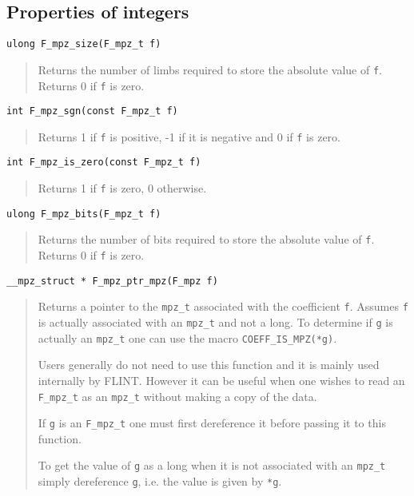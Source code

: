 \documentclass[a4paper,10pt]{article}
\newcommand{\code}{\lstinline}
\begin{document}
\subsection{Properties of integers}

\begin{lstlisting}
ulong F_mpz_size(F_mpz_t f)
\end{lstlisting}
\begin{quote}
Returns the number of limbs required to store the absolute value of \code{f}. Returns 0 if \code{f} is zero.
\end{quote}

\begin{lstlisting}
int F_mpz_sgn(const F_mpz_t f)
\end{lstlisting}
\begin{quote}
Returns 1 if \code{f} is positive, -1 if it is negative and 0 if \code{f} is zero.
\end{quote}

\begin{lstlisting}
int F_mpz_is_zero(const F_mpz_t f)
\end{lstlisting}
\begin{quote}
Returns 1 if \code{f} is zero, 0 otherwise.
\end{quote}

\begin{lstlisting}
ulong F_mpz_bits(F_mpz_t f)
\end{lstlisting}
\begin{quote}
Returns the number of bits required to store the absolute value of \code{f}. Returns 0 if \code{f} is zero.
\end{quote}

\begin{lstlisting}
__mpz_struct * F_mpz_ptr_mpz(F_mpz f)
\end{lstlisting}
\begin{quote}
Returns a pointer to the \code{mpz_t} associated with the coefficient \code{f}. Assumes \code{f} is actually associated with an \code{mpz_t} and not a long. To determine if \code{g} is actually an \code{mpz_t} one can use the macro \code{COEFF_IS_MPZ(*g)}.

Users generally do not need to use this function and it is mainly used internally by FLINT. However it can be useful when one wishes to read an \code{F_mpz_t} as an \code{mpz_t} without making a copy of the data. 

If \code{g} is an \code{F_mpz_t} one must first dereference it before passing it to this function. 

To get the value of \code{g} as a long when it is not associated with an \code{mpz_t} simply dereference \code{g}, i.e. the value is given by \code{*g}.
\end{quote}
\end{document}
